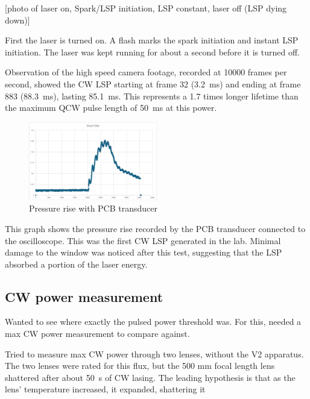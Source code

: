             [photo of laser on, Spark/LSP initiation, LSP constant, laser off (LSP dying down)]



            First the laser is turned on. A flash marks the spark initiation and instant LSP initiation. The laser was kept running for about a second before it is turned off.

            Observation of the high speed camera footage, recorded at 10000 frames per second, showed the CW LSP starting at frame 32 (\qty{3.2}{ms}) and ending at frame 883 (\qty{88.3}{ms}), lasting \qty{85.1}{ms}. This represents a 1.7 times longer lifetime than the maximum QCW pulse length of \qty{50}{ms} at this power.


            \begin{figure}[!ht]
                \centering
                \includegraphics[width=0.5\textwidth]{assets/4 experiments/CW pressure rise.png}
                \caption{Pressure rise with PCB transducer}
            \end{figure}

            This graph shows the pressure rise recorded by the PCB transducer connected to the oscilloscope. This was the first CW LSP generated in the lab.  Minimal damage to the window was noticed after this test, suggesting that the LSP absorbed a portion of the laser energy.

        \subsection{CW power measurement}

            Wanted to see where exactly the pulsed power threshold was. For this, needed a max CW power measurement to compare against. 
    
            Tried to measure max CW power through two lenses, without the V2 apparatus. The two lenses were rated for this flux, but the 500 mm focal length lens shattered after about \qty{50}{s} of CW lasing. The leading hypothesis is that as the lens' temperature increased, it expanded, shattering it
    
